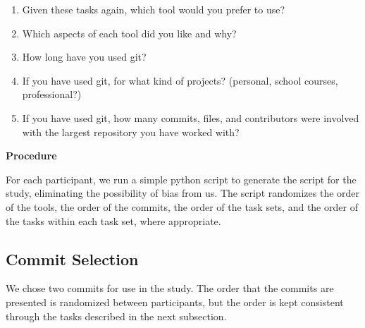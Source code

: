 \documentclass[draft]{IEEEtran}
\begin{document}
\begin{enumerate}
  \item Given these tasks again, which tool would you prefer to use?
  \item Which aspects of each tool did you like and why?
  \item How long have you used git?
  \item If you have used git, for what kind of projects? (personal,
    school courses, professional?)
  \item If you have used git, how many commits, files, and contributors
    were involved with the largest repository you have worked with?
\end{enumerate}


\textbf{Procedure}




For each participant, we run a simple python script to generate the
script for the study, eliminating the possibility of bias from us. The
script randomizes the order of the tools, the order of the commits, the
order of the task sets, and the order of the tasks within each task set,
where appropriate.


\subsection{Commit Selection}
\label{sub:commit_selection}


We chose two commits for use in the study. The order that the commits
are presented is randomized between participants, but the order is kept
consistent through the tasks described in the next subsection.
\end{document}
